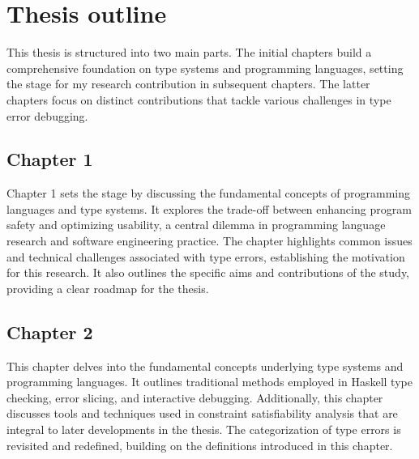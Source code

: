





\section{Thesis outline}

 This thesis is structured into two main parts. The initial chapters build a comprehensive foundation on type systems and programming languages, setting the stage for my research contribution in subsequent chapters. The latter chapters focus on distinct contributions that tackle various challenges in type error debugging.

\subsection{Chapter 1}
Chapter 1 sets the stage by discussing the fundamental concepts of programming languages and type systems. It explores the trade-off between enhancing program safety and optimizing usability, a central dilemma in programming language research and software engineering practice. The chapter highlights common issues and technical challenges associated with type errors, establishing the motivation for this research. It also outlines the specific aims and contributions of the study, providing a clear roadmap for the thesis.

\subsection{Chapter 2}
This chapter delves into the fundamental concepts underlying type systems and programming languages. It outlines traditional methods employed in Haskell type checking, error slicing, and interactive debugging. Additionally, this chapter discusses tools and techniques used in constraint satisfiability analysis that are integral to later developments in the thesis. The categorization of type errors is revisited and redefined, building on the definitions introduced in this chapter.
    
